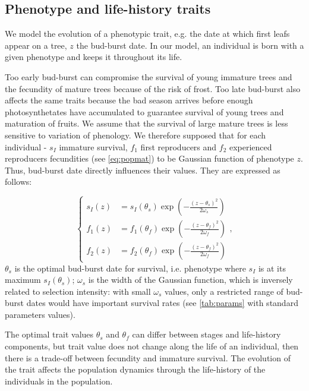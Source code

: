 \subsection*{Phenotype and life-history traits}

We model the evolution of a phenotypic trait, e.g. the date at which first leafs appear on a tree, $z$ the bud-burst date. In our model, an individual is born with a given phenotype and keeps it throughout its life.

Too early bud-burst can compromise the survival of young immature trees and the fecundity of mature trees because of the risk of frost. Too late bud-burst also affects the same traits because the bad season arrives before enough photosynthetates have accumulated to guarantee survival of young trees and maturation of fruits. We assume that the survival of large mature trees is less sensitive to variation of phenology. We therefore supposed that for each individual - $s_{I}$ immature survival, $f_1$ first reproducers and $f_2$ experienced reproducers fecundities (see \autoref{eq:popmat}) to be Gaussian function of phenotype $z$. Thus, bud-burst date directly influences their values. They are expressed as follows:

\begin{equation}
	\label{eq:indlht}
	\left\{
	\begin{aligned}
	s_{I}(z) &= s_{I}(\theta_{s})	\exp\left(-\frac{(z - \theta_{s})^2}{2\omega_{s}}\right) \\
	f_1(z) &= f_1(\theta_{f})	\exp\left(-\frac{(z - \theta_{f})^2}{2\omega_{f}}\right) \\
	f_2(z) &= f_2(\theta_{f})	\exp\left(-\frac{(z - \theta_{f})^2}{2\omega_{f}}\right)
	\end{aligned}
	\right.,
\end{equation}
$\theta_s$ is the optimal bud-burst date for survival, i.e. phenotype where $s_I$ is at its maximum $s_I(\theta_s)$; $\omega_s$ is the width of the Gaussian function, which is inversely related to selection intensity: with small $\omega_s$ values, only a restricted range of bud-burst dates would have important survival rates (see \autoref{tab:params} with standard parameters values).

The optimal trait values $\theta_s$ and $\theta_f$ can differ between stages and life-history components, but trait value does not change along the life of an individual, then there is a trade-off between fecundity and immature survival. The evolution of the trait affects the population dynamics through the life-history of the individuals in the population.

